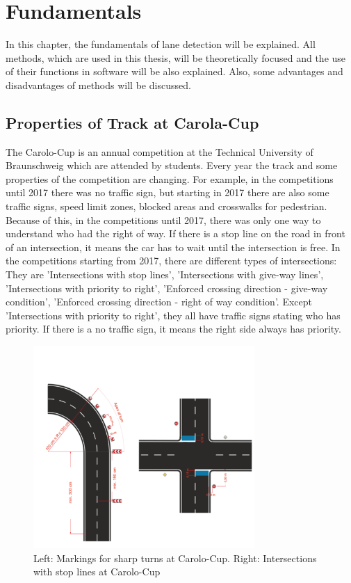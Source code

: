 %
\chapter{Fundamentals}\label{cha:Fundamentals}
%
In this chapter, the fundamentals of lane detection will be explained. All methods, which are used in this thesis, will be theoretically focused and the use of their functions in software will be also explained. Also, some advantages and disadvantages of methods will be discussed.
%
\section{Properties of Track at Carola-Cup}\label{sec:Properties of Truck at Carolo-Cup}
%
The Carolo-Cup is an annual competition at the Technical University of Braunschweig which are attended by students. Every year the track and some properties of the competition are changing. For example, in the competitions until 2017 there was no traffic sign, but starting in 2017 there are also some traffic signs, speed limit zones, blocked areas and crosswalks for pedestrian. Because of this, in the competitions until 2017, there was only one way to understand who had the right of way. If there is a stop line on the road in front of an intersection, it means the car has to wait until the intersection is free. In the competitions starting from 2017, there are different types of intersections: They are 'Intersections with stop lines', 'Intersections with give-way lines', 'Intersections with priority to right', 'Enforced crossing direction - give-way condition', 'Enforced crossing direction - right of way condition'. Except 'Intersections with priority to right', they all have traffic signs stating who has priority. If there is a no traffic sign, it means the right side always has priority.\cite{Carolo_Cup}



\begin{figure}[H]
 \centering
  \includegraphics[width=0.75\textwidth]{./Bilder/Intersections.png}
  \caption{Left: Markings for sharp turns at Carolo-Cup.
Right: Intersections with stop lines at Carolo-Cup\cite{Carolo_Cup}}
  \label{fig:Intersections}
\end{figure}



